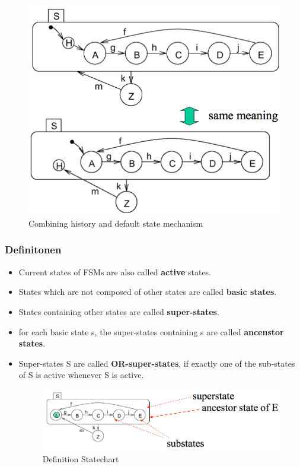\begin{figure}[h]
  \centering
  {\includegraphics[scale = 0.3]{images/FSM/history_default_state_mechanism}  
  \caption{Combining history and default state mechanism}
  \label{fig:history_default_state_mechanism}}
\end{figure} 

\subsubsection{Definitonen}
\begin{itemize}
  \item Current states of FSMs are also called \textbf{active} states.
  \item States which are not composed of other states are called \textbf{basic
  states}.
  \item States containing other states are called \textbf{super-states}.
  \item for each basic state s, the super-states containing s are called
  \textbf{ancenstor states}.
  \item Super-states S are called \textbf{OR-super-states}, if exactly one of
  the sub-states of S is active whenever S is active.
\begin{figure}[h]
  \centering
  {\includegraphics[scale = 0.3]{images/FSM/definition_statechart}  
  \caption{Definition Statechart}
  \label{fig:definition_statechart}}
\end{figure} 
\end{itemize}
